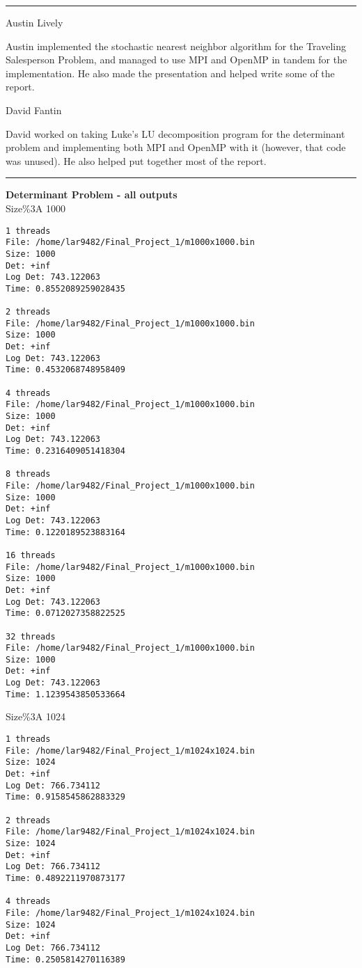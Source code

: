 \documentclass[letter, 12pt]{article}
\newcommand{\memberb}{Austin Lively}
\newcommand{\memberc}{David Fantin}
\newenvironment{question}[1]{%
    \vspace{.2in}%
        \noindent{\bf #1}%
    \vspace{0.3em} \hrule \vspace{.1in}%
}{}
\begin{document}
\begin{question}{\large Traveling Salesperson Problem}
\memberb

Austin implemented the stochastic nearest neighbor algorithm for the Traveling Salesperson Problem, and managed to use MPI and OpenMP in tandem for the implementation. He also made the presentation and helped write some of the report.

\memberc

David worked on taking Luke's LU decomposition program for the determinant problem and implementing both MPI and OpenMP with it (however, that code was unused). He also helped put together most of the report.

\end{question}

\newpage
\begin{question}{\large Appendix}

\textbf{\large Determinant Problem - all outputs}\\

Size\%3A 1000
\begin{lstlisting}[style=CStyle]
1 threads
File: /home/lar9482/Final_Project_1/m1000x1000.bin
Size: 1000
Det: +inf
Log Det: 743.122063
Time: 0.8552089259028435

2 threads
File: /home/lar9482/Final_Project_1/m1000x1000.bin
Size: 1000
Det: +inf
Log Det: 743.122063
Time: 0.4532068748958409

4 threads
File: /home/lar9482/Final_Project_1/m1000x1000.bin
Size: 1000
Det: +inf
Log Det: 743.122063
Time: 0.2316409051418304

8 threads
File: /home/lar9482/Final_Project_1/m1000x1000.bin
Size: 1000
Det: +inf
Log Det: 743.122063
Time: 0.1220189523883164

16 threads
File: /home/lar9482/Final_Project_1/m1000x1000.bin
Size: 1000
Det: +inf
Log Det: 743.122063
Time: 0.0712027358822525

32 threads
File: /home/lar9482/Final_Project_1/m1000x1000.bin
Size: 1000
Det: +inf
Log Det: 743.122063
Time: 1.1239543850533664
\end{lstlisting}

Size\%3A 1024
\begin{lstlisting}[style=CStyle]
1 threads
File: /home/lar9482/Final_Project_1/m1024x1024.bin
Size: 1024
Det: +inf
Log Det: 766.734112
Time: 0.9158545862883329

2 threads
File: /home/lar9482/Final_Project_1/m1024x1024.bin
Size: 1024
Det: +inf
Log Det: 766.734112
Time: 0.4892211970873177

4 threads
File: /home/lar9482/Final_Project_1/m1024x1024.bin
Size: 1024
Det: +inf
Log Det: 766.734112
Time: 0.2505814270116389


\end{lstlisting}
\end{question}
\end{document}
